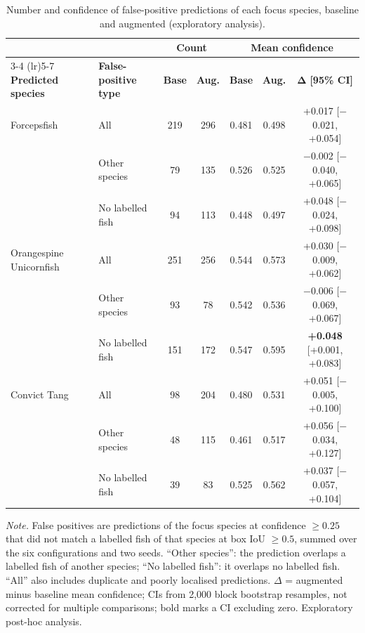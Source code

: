\begin{table}[htbp]
    \centering
    \caption[Confidence of focus-species false positives]{Number and confidence of false-positive predictions of each focus species, baseline and augmented (exploratory analysis).}
    \label{tab:conf_fp}
    \small
    \setlength{\tabcolsep}{4.5pt}
    \renewcommand{\arraystretch}{1.2}
    \begin{tabular}{llccccc}
        \toprule
        & & \multicolumn{2}{c}{\textbf{Count}} & \multicolumn{3}{c}{\textbf{Mean confidence}} \\
        \cmidrule(lr){3-4} \cmidrule(lr){5-7}
        \textbf{Predicted species} & \textbf{False-positive type} & \textbf{Base} & \textbf{Aug.} & \textbf{Base} & \textbf{Aug.} & $\boldsymbol{\Delta}$ \textbf{[95\% CI]} \\
        \midrule
        Forcepsfish             & All               & 219 & 296 & 0.481 & 0.498 & +0.017 [$-$0.021, +0.054] \\
                                & Other species     & 79  & 135 & 0.526 & 0.525 & $-$0.002 [$-$0.040, +0.065] \\
                                & No labelled fish  & 94  & 113 & 0.448 & 0.497 & +0.048 [$-$0.024, +0.098] \\
        \midrule
        Orangespine Unicornfish & All               & 251 & 256 & 0.544 & 0.573 & +0.030 [$-$0.009, +0.062] \\
                                & Other species     & 93  & 78  & 0.542 & 0.536 & $-$0.006 [$-$0.069, +0.067] \\
                                & No labelled fish  & 151 & 172 & 0.547 & 0.595 & \textbf{+0.048} [+0.001, +0.083] \\
        \midrule
        Convict Tang            & All               & 98  & 204 & 0.480 & 0.531 & +0.051 [$-$0.005, +0.100] \\
                                & Other species     & 48  & 115 & 0.461 & 0.517 & +0.056 [$-$0.034, +0.127] \\
                                & No labelled fish  & 39  & 83  & 0.525 & 0.562 & +0.037 [$-$0.057, +0.104] \\
        \bottomrule
    \end{tabular}

    \vspace{3pt}
    \begin{minipage}{\linewidth}
    \footnotesize\textit{Note.} False positives are predictions of the focus species at confidence $\geq 0.25$ that did not
    match a labelled fish of that species at box IoU $\geq 0.5$, summed over the six configurations and two seeds. ``Other
    species'': the prediction overlaps a labelled fish of another species; ``No labelled fish'': it overlaps no labelled fish.
    ``All'' also includes duplicate and poorly localised predictions. $\Delta$ = augmented minus baseline mean confidence;
    CIs from 2,000 block bootstrap resamples, not corrected for multiple comparisons; bold marks a CI excluding zero.
    Exploratory post-hoc analysis.
    \end{minipage}
\end{table}
